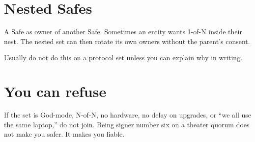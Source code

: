 \section{Nested Safes}

A Safe as owner of another Safe. Sometimes an
entity wants 1-of-N inside their nest. The nested
set can then rotate its own owners without the
parent's consent.

Usually do not do this on a protocol set unless
you can explain why in writing.

\section{You can refuse}

If the set is God-mode, N-of-N, no hardware, no
delay on upgrades, or ``we all use the same
laptop,'' do not join. Being signer number six on
a theater quorum does not make you safer. It makes
you liable.
